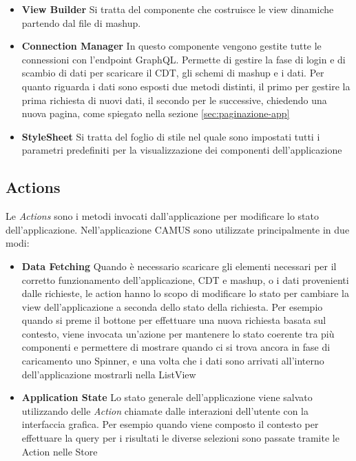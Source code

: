 \begin{itemize}
	\item \textbf{View Builder} Si tratta del componente che costruisce le view dinamiche partendo dal file di mashup. 
	\item \textbf{Connection Manager} In questo componente vengono gestite tutte le connessioni con l'endpoint GraphQL. Permette di gestire la fase di login e di scambio di dati per scaricare il CDT, gli schemi di mashup e i dati. Per quanto riguarda i dati sono esposti due metodi distinti, il primo per gestire la prima richiesta di nuovi dati, il secondo per le successive, chiedendo una nuova pagina, come spiegato nella sezione \ref{sec:paginazione-app}
	\item \textbf{StyleSheet} Si tratta del foglio di stile nel quale sono impostati tutti i parametri predefiniti per la visualizzazione dei componenti dell'applicazione
\end{itemize}

\subsection{Actions}\label{sec:actions}
Le \emph{Actions} sono i metodi invocati dall'applicazione per modificare lo stato dell'applicazione. Nell'applicazione CAMUS sono utilizzate principalmente in due modi: 
\begin{itemize}
	\item \textbf{Data Fetching} Quando è necessario scaricare gli elementi necessari per il corretto funzionamento dell'applicazione, CDT e mashup, o i dati provenienti dalle richieste, le action hanno lo scopo di modificare lo stato per cambiare la view dell'applicazione a seconda dello stato della richiesta.
	Per esempio quando si preme il bottone per effettuare una nuova richiesta basata sul contesto, viene invocata un'azione per mantenere lo stato coerente tra più componenti e permettere di mostrare quando ci si trova ancora in fase di caricamento uno Spinner, e una volta che i dati sono arrivati all'interno dell'applicazione mostrarli nella ListView
	\item \textbf{Application State} Lo stato generale dell'applicazione viene salvato utilizzando delle \emph{Action} chiamate dalle interazioni dell'utente con la interfaccia grafica. Per esempio quando viene composto il contesto per effettuare la query per i risultati le diverse selezioni sono passate tramite le Action nelle Store
\end{itemize}	

